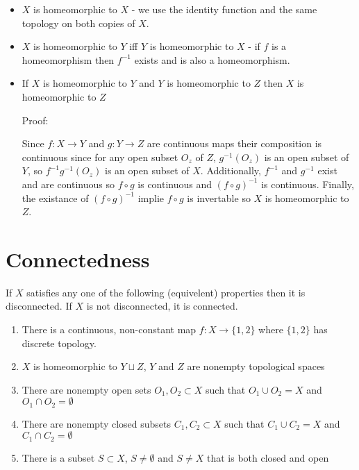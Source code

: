 \documentclass{homework}
\begin{document}
\begin{itemize}
    \item $X$ is homeomorphic to $X$ - we use the identity function and the same topology on both copies of $X$. 
    \item $X$ is homeomorphic to $Y$ iff $Y$ is homeomorphic to $X$ - if $f$ is a homeomorphism then $f^{-1}$ exists and is also a homeomorphism.
    \item If $X$ is homeomorphic to $Y$ and $Y$ is homeomorphic to $Z$ then $X$ is homeomorphic to $Z$ 
    
    Proof: 
    
    Since $f: X \rightarrow Y$ and $g: Y \rightarrow Z$ are continuous maps their composition is continuous since for any open subset $O_z$ of $Z$, $g^{-1}(O_z)$ is an open subset of $Y$, so $f^{-1}g^{-1}(O_z)$ is an open subset of $X$. Additionally, $f^{-1}$ and $g^{-1}$ exist and are continuous so $f \circ g$ is continuous and $(f \circ g)^{-1}$ is continuous. Finally, the existance of $(f \circ g)^{-1}$ implie $f \circ g$ is invertable so $X$ is homeomorphic to $Z$.

    

    
\end{itemize}


\section{Connectedness}

If $X$ satisfies any one of the following (equivelent) properties then it is disconnected. If $X$ is not disconnected, it is connected. 

\begin{enumerate}
    \item There is a continuous, non-constant map $f:X \rightarrow \{1,2\}$ where $\{1,2\}$ has discrete topology.
    \item $X$ is homeomorphic to $Y \sqcup Z$, $Y$ and $Z$ are nonempty topological spaces
    \item {There are nonempty open sets $O_1,O_2 \subset X$ such that $O_1 \cup O_2 = X$ and $O_1 \cap O_2 = \emptyset$}
    \item {There are nonempty closed subsets $C_1,C_2 \subset X$ such that  $C_1 \cup C_2 = X$ and $C_1 \cap C_2 = \emptyset$}
    \item{There is a subset $S \subset X$, $S \neq \emptyset$ and $S \neq X$ that is both closed and open}
    
\end{enumerate}
\end{document}
